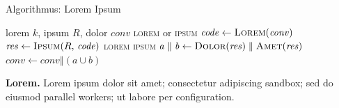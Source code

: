 
\begin{block}{Algorithmus: Lorem Ipsum}
\renewcommand{\algorithmicrequire}{\textbf{Lorem:}}
\renewcommand{\algorithmicensure}{\textbf{Ipsum:}}
\begin{algorithmic}[1]
\Require lorem $k$, ipsum $R$, dolor $\mathit{conv}$
\Ensure \textsc{lorem} or \textsc{ipsum}
  \State $\mathit{code} \gets \Call{Lorem}{\mathit{conv}}$ 
  \State $\mathit{res} \gets \Call{Ipsum}{R,\,\mathit{code}}$
    \State \Return \textsc{lorem}
  \EndIf
    \State \Return \textsc{ipsum}
  \EndIf
  \State $\mathit{a} \parallel \mathit{b} \gets \Call{Dolor}{\mathit{res}} \parallel \Call{Amet}{\mathit{res}}$
  \State $\mathit{conv} \gets \mathit{conv} \mathbin{\Vert} (\mathit{a} \cup \mathit{b})$ 
\EndFor
\end{algorithmic}

\vspace{0.4em}
{\footnotesize\textbf{Lorem.} Lorem ipsum dolor sit amet; consectetur adipiscing sandbox; sed do eiusmod parallel workers; ut labore per configuration.}
\end{block}
